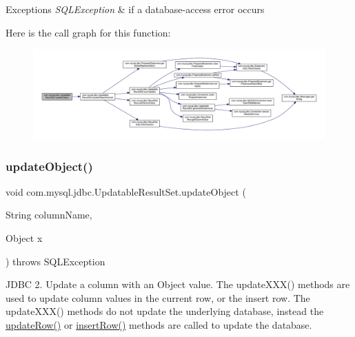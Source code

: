 \begin{DoxyExceptions}{Exceptions}
{\em S\+Q\+L\+Exception} & if a database-\/access error occurs \\
\hline
\end{DoxyExceptions}
Here is the call graph for this function\+:
\nopagebreak
\begin{figure}[H]
\begin{center}
\leavevmode
\includegraphics[width=350pt]{classcom_1_1mysql_1_1jdbc_1_1_updatable_result_set_ae3c19f739c122b5b6766b868f6bc39a6_cgraph}
\end{center}
\end{figure}
\mbox{\label{classcom_1_1mysql_1_1jdbc_1_1_updatable_result_set_abf296b039e8adf6ac5b8a2aabaac86a7}} 
\subsubsection{\texorpdfstring{update\+Object()}{updateObject()}\hspace{0.1cm}{\footnotesize\ttfamily [3/4]}}
{\footnotesize\ttfamily void com.\+mysql.\+jdbc.\+Updatable\+Result\+Set.\+update\+Object (\begin{DoxyParamCaption}\item[{String}]{column\+Name,  }\item[{Object}]{x }\end{DoxyParamCaption}) throws S\+Q\+L\+Exception}

J\+D\+BC 2. Update a column with an Object value. The update\+X\+X\+X() methods are used to update column values in the current row, or the insert row. The update\+X\+X\+X() methods do not update the underlying database, instead the \mbox{\hyperlink{classcom_1_1mysql_1_1jdbc_1_1_updatable_result_set_a919969ba4b3c7cbc7b18605e9f31a746}{update\+Row()}} or \mbox{\hyperlink{classcom_1_1mysql_1_1jdbc_1_1_updatable_result_set_aef041f8d9d0778083716fc26652648fa}{insert\+Row()}} methods are called to update the database.


